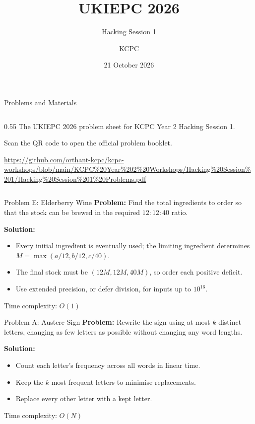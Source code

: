 \documentclass{beamer}
\title{UKIEPC 2026}
\subtitle{Hacking Session 1}
\author{KCPC}
\date{21 October 2026}
\newcommand{\problemframe}[5]{%
    \begin{frame}{Problem #1: #2}
        \textbf{Problem:} #3\par
        \vspace{0.5em}
        \textbf{Solution:}
        \begin{itemize}
            \setlength{\itemsep}{0.25em}
            #4
        \end{itemize}
        \vfill
        {\small\textcolor{kcpc-muted}{Time complexity: #5}\par}
    \end{frame}
}
\begin{document}
\begin{frame}
    \titlepage
\end{frame}

\begin{frame}[fragile]{Problems and Materials}
    \begin{columns}[c]
        \begin{column}{0.55\textwidth}
            The UKIEPC 2026 problem sheet for KCPC Year 2 Hacking Session 1.
            \par\vspace{0.8em}
            Scan the QR code to open the official problem booklet.
            \par\vspace{0.8em}
            {\scriptsize\url{https://github.com/orthant-kcpc/kcpc-workshops/blob/main/KCPC\%20Year\%202\%20Workshops/Hacking\%20Session\%201/Hacking\%20Session\%201\%20Problems.pdf}}
        \end{column}
    \end{columns}
\end{frame}

\problemframe{E}{Elderberry Wine}
    {Find the total ingredients to order so that the stock can be brewed in the required $12:12:40$ ratio.}
    {\item<1-> Every initial ingredient is eventually used; the limiting ingredient determines $M=\max(a/12,b/12,c/40)$.
     \item<1-> The final stock must be $(12M,12M,40M)$, so order each positive deficit.
     \item<1-> Use extended precision, or defer division, for inputs up to $10^{16}$.}
    {$O(1)$}

\problemframe{A}{Austere Sign}
    {Rewrite the sign using at most $k$ distinct letters, changing as few letters as possible without changing any word lengths.}
    {\item<1-> Count each letter's frequency across all words in linear time.
     \item<1-> Keep the $k$ most frequent letters to minimise replacements.
     \item<1-> Replace every other letter with a kept letter.}
    {$O(N)$}
\end{document}
